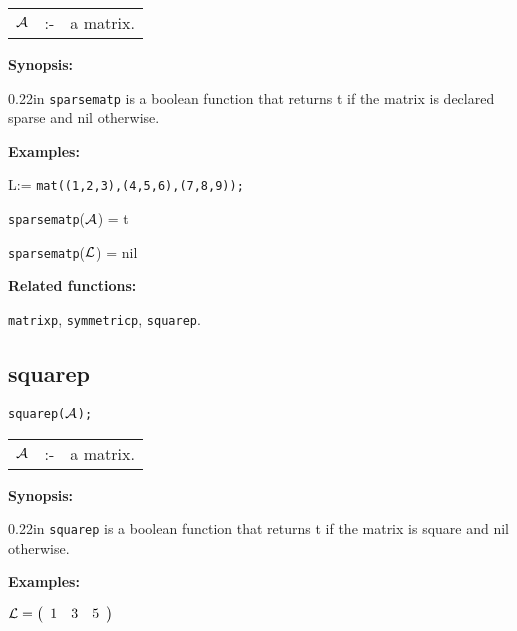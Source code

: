 \hspace*{0.1in}  
\begin{tabular}{l l l} 
${\cal A}$ &:-& a matrix.
\end{tabular}

{\bf Synopsis:} 

\begin{addtolength}{\leftskip}{0.22in}
{\tt sparsematp} is a boolean function that returns t if 
                the matrix is declared sparse and nil otherwise.

\end{addtolength}

{\bf Examples:}

\begin{flushleft}
\hspace*{0.175in}
{\cal L}:= {\tt mat((1,2,3),(4,5,6),(7,8,9));}
\end{flushleft}

\vspace*{0.1in}

\hspace*{0.175in} {\tt sparsematp}(${\cal A}$) = t 

\hspace*{0.175in} {\tt sparsematp}(${\cal L}$) = nil

{\bf Related functions:}

\hspace*{0.175in} {\tt matrixp}, {\tt symmetricp}, {\tt squarep}.


\subsection{squarep}

\hspace*{0.175in} {\tt squarep(${\cal A}$);}

\hspace*{0.1in}  
\begin{tabular}{l l l} 
${\cal A}$ &:-& a matrix.
\end{tabular}

{\bf Synopsis:} 

\begin{addtolength}{\leftskip}{0.22in}
{\tt squarep} is a boolean function that returns t if 
                the matrix is square and nil otherwise.

\end{addtolength}

{\bf Examples:}

\begin{flushleft}
\hspace*{0.175in}
\begin{math}  
{\cal L} = \left( \begin{array}{ccc} 1 & 3 & 5 
\end{array} \right)
\end{math}  
\end{flushleft}

